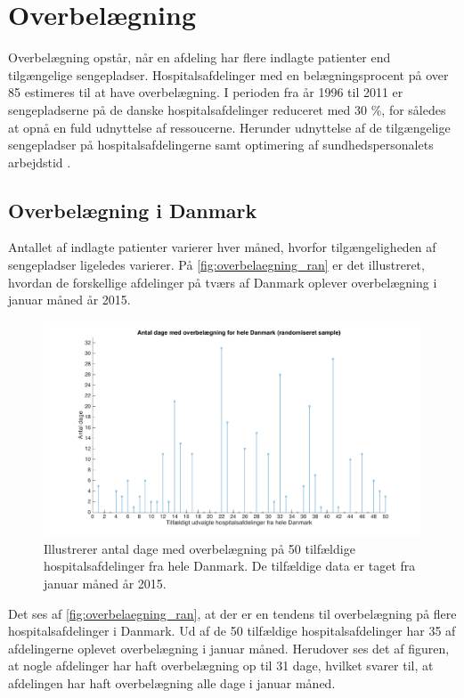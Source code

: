 \section{Overbelægning}\label{sec:overbelaegning}
Overbelægning opstår, når en afdeling har flere indlagte patienter end tilgængelige sengepladser. \cite{denstoredanskeordbog1} Hospitalsafdelinger med en belægningsprocent på over 85 estimeres til at have overbelægning. I perioden fra år 1996 til 2011 er sengepladserne på de danske hospitalsafdelinger reduceret med 30 \%, for således at opnå en fuld udnyttelse af ressoucerne. Herunder udnyttelse af de tilgængelige sengepladser på hospitalsafdelingerne samt optimering af sundhedspersonalets arbejdstid \cite{Madsen2014}. 


\subsection{Overbelægning i Danmark}
Antallet af indlagte patienter varierer hver måned, hvorfor tilgængeligheden af sengepladser ligeledes varierer. På \autoref{fig:overbelaegning_ran} er det illustreret, hvordan de forskellige afdelinger  på tværs af Danmark oplever overbelægning i januar måned år 2015.

\begin{figure}[H]
\centering
\includegraphics[width=1\textwidth]{figures/overbelaegning_ran}
\caption{Illustrerer antal dage med overbelægning på 50 tilfældige hospitalsafdelinger fra hele Danmark. De tilfældige data er taget fra januar måned år 2015. \cite{SDS2015}} 
\label{fig:overbelaegning_ran}
\end{figure}

\noindent
Det ses af \autoref{fig:overbelaegning_ran}, at der er en tendens til overbelægning på flere hospitalsafdelinger i Danmark. Ud af de 50 tilfældige hospitalsafdelinger har 35 af afdelingerne oplevet overbelægning i januar måned. Herudover ses det af figuren, at nogle afdelinger har haft overbelægning op til 31 dage, hvilket svarer til, at afdelingen har haft overbelægning alle dage i januar måned.

